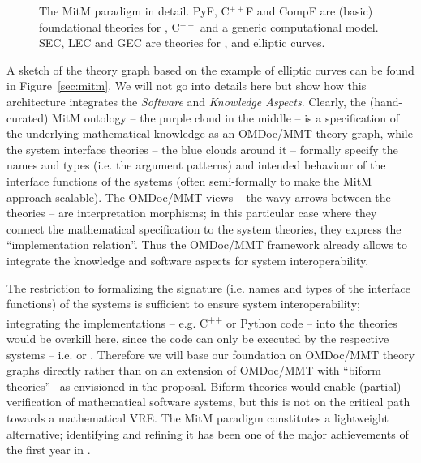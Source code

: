 \begin{figure}[ht]\centering
  \def\myxscale{3}\def\myyscale{1.2}
  
  \caption{The MitM paradigm in detail. PyF, C${}^{++}$F and CompF are (basic)
    foundational theories for \python, C${}^{++}$ and a generic computational model. SEC,
    LEC and GEC are theories for \SageMath, \LMFDB and \GAP elliptic curves.}\label{fig:mitm}
\end{figure}

A sketch of the theory graph based on the example of elliptic curves can be found in
Figure~\ref{sec:mitm}. We will not go into details here but show how this architecture
integrates the \emph{Software} and \emph{Knowledge Aspects}. Clearly, the (hand-curated)
MitM ontology -- the purple cloud in the middle -- is a specification of the underlying
mathematical knowledge as an OMDoc/MMT theory graph, while the system interface theories
-- the blue clouds around it -- formally specify the names and types (i.e. the argument
patterns) and intended behaviour of the interface functions of the systems (often
semi-formally to make the MitM approach scalable). The OMDoc/MMT views -- the wavy arrows
between the theories -- are interpretation morphisms; in this particular case where they
connect the mathematical specification to the system theories, they express the
``implementation relation''. Thus the OMDoc/MMT framework already allows to integrate the
knowledge and software aspects for system interoperability.

The restriction to formalizing the signature (i.e. names and types of the interface
functions) of the systems is sufficient to ensure system interoperability; integrating the
implementations -- e.g. C\textsuperscript{++} or Python code -- into the theories would
be overkill here, since the code can only be executed by the respective systems --
i.e. \GAP or \SageMath. Therefore we will base our foundation on OMDoc/MMT theory graphs
directly rather than on an extension of OMDoc/MMT with ``biform
theories''~\cite{KohManRab:aumftg13,Farmer:btc07} as envisioned in the proposal. Biform
theories would enable (partial) verification of mathematical software systems, but this is
not on the critical path towards a mathematical VRE. The MitM paradigm constitutes a
lightweight alternative; identifying and refining it has been one of the major
achievements of the first year in .

